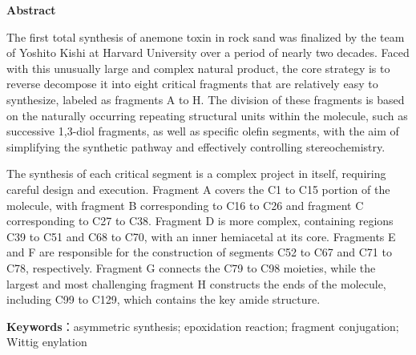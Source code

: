 \vspace*{-30pt}
\begin{center}
    \heiti \textbf{Abstract}
\end{center}
\vspace*{-10pt}


 The first total synthesis of anemone toxin in rock sand was finalized by the team of Yoshito Kishi at Harvard University over a period of nearly two decades. Faced with this unusually large and complex natural product, the core strategy is to reverse decompose it into eight critical fragments that are relatively easy to synthesize, labeled as fragments A to H. The division of these fragments is based on the naturally occurring repeating structural units within the molecule, such as successive 1,3-diol fragments, as well as specific olefin segments, with the aim of simplifying the synthetic pathway and effectively controlling stereochemistry.

 The synthesis of each critical segment is a complex project in itself, requiring careful design and execution. Fragment A covers the C1 to C15 portion of the molecule, with fragment B corresponding to C16 to C26 and fragment C corresponding to C27 to C38. Fragment D is more complex, containing regions C39 to C51 and C68 to C70, with an inner hemiacetal at its core. Fragments E and F are responsible for the construction of segments C52 to C67 and C71 to C78, respectively. Fragment G connects the C79 to C98 moieties, while the largest and most challenging fragment H constructs the ends of the molecule, including C99 to C129, which contains the key amide structure.




\vspace{0.5cm}
\noindent
{}\heiti \textbf{Keywords}：\songti asymmetric synthesis; epoxidation reaction; fragment conjugation; Wittig enylation




\clearpage
\thispagestyle{fancy} %
\begin{spacing}{1}
    \tableofcontents
\end{spacing}
\thispagestyle{fancy} %
\newpage